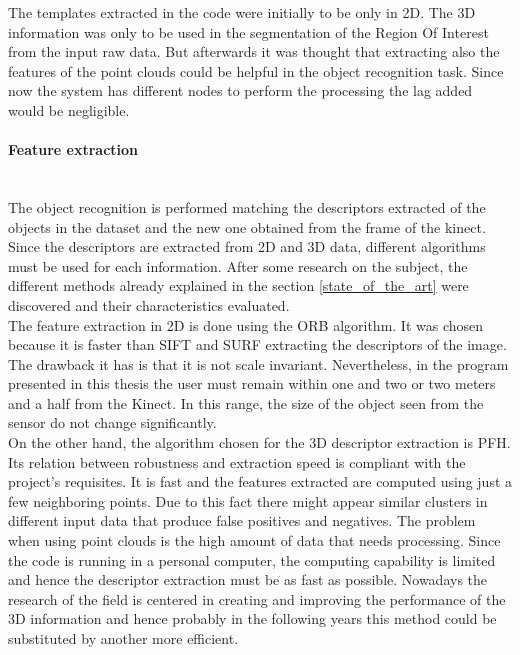 The templates extracted in the code were initially to be only in 2D. The 3D information was only to be used in the segmentation of the Region Of Interest from the input raw data. But afterwards it was thought that extracting also the features of the point clouds could be helpful in the object recognition task. Since now the system has different nodes to perform the processing the lag added would be negligible. 
\\

\paragraph{Feature extraction}
\mbox{} \\


The object recognition is performed matching the descriptors extracted of the objects in the dataset and the new one obtained from the frame of the kinect. Since the descriptors are extracted from 2D and 3D data, different algorithms must be used for each information. After some research on the subject, the different methods already explained in the section \ref{state_of_the_art} were discovered and their characteristics evaluated. 
\\

The feature extraction in 2D is done using the ORB algorithm. It was chosen because it is faster than SIFT and SURF extracting the descriptors of the image. The drawback it has is that it is not scale invariant. Nevertheless, in the program presented in this thesis the user must remain within one and two or two meters and a half from the Kinect. In this range, the size of the object seen from the sensor do not change significantly. 
\\

On the other hand, the algorithm chosen for the 3D descriptor extraction is PFH. Its relation between robustness and extraction speed is compliant with the project's requisites. It is fast and the features extracted are computed using just a few neighboring points. Due to this fact there might appear similar clusters in different input data that produce false positives and negatives. The problem when using point clouds is the high amount of data that needs processing. Since the code is running in a personal computer, the computing capability is limited and hence the descriptor extraction must be as fast as possible. Nowadays the research of the field is centered in creating and improving the performance of the 3D information and hence probably in the following years this method could be substituted by another more efficient.  
